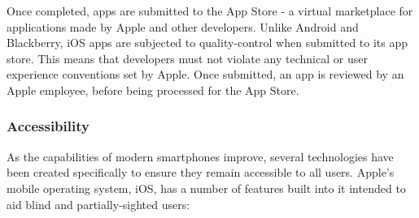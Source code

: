 \documentclass[10pt,twocolumn]{article}
\begin{document}
Once completed, apps are submitted to the App Store - a virtual marketplace for applications made by Apple and other developers.  Unlike Android and Blackberry, iOS apps are subjected to quality-control when submitted to its app store. This means that developers must not violate any technical or user experience conventions set by Apple. Once submitted, an app is reviewed by an Apple employee, before being processed for the App Store.

\subsubsection{Accessibility}
\label{sec:iosAccessibility}
As the capabilities of modern smartphones improve, several technologies have been created specifically to ensure they remain accessible to all users. Apple's mobile operating system, iOS, has a number of features built into it intended to aid blind and partially-sighted users:
\end{document}
